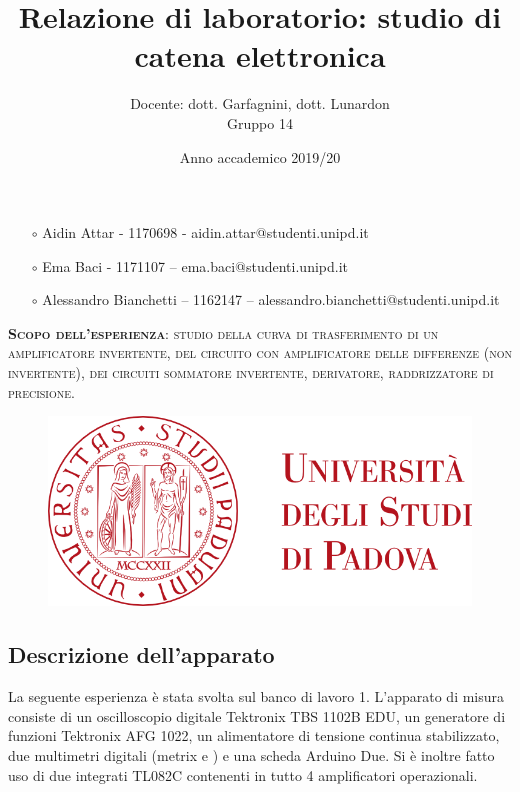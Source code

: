 \documentclass{article}
\title{Relazione di laboratorio: studio di catena elettronica}
\author{Docente: dott. Garfagnini, dott. Lunardon \\
Gruppo 14}
\date{Anno accademico 2019/20}
\begin{document}
\maketitle

\begin{itemize}
    \item[$\circ$] Aidin Attar - 1170698 - aidin.attar@studenti.unipd.it
    \item[$\circ$] Ema Baci - 1171107 – ema.baci@studenti.unipd.it
    \item[$\circ$] Alessandro Bianchetti – 1162147 – alessandro.bianchetti@studenti.unipd.it
\end{itemize}

\vspace{3 cm}
\begin{large}\textsc{\textbf{Scopo dell'esperienza}: studio della curva di trasferimento di un amplificatore invertente, del circuito con amplificatore delle differenze (non invertente), dei circuiti sommatore invertente, derivatore, raddrizzatore di precisione.} 
\end{large}
\vspace{8.5cm}

\begin{figure}[H]
\centering
\includegraphics[scale=0.5, angle=0]{unipd_logo.png}
\end{figure}


\twocolumn

\subsection*{Descrizione dell'apparato} La seguente esperienza è stata svolta sul banco di lavoro 1. L'apparato di misura consiste di 
un oscilloscopio digitale Tektronix TBS 1102B EDU, un generatore di funzioni Tektronix AFG 1022, un alimentatore di tensione continua stabilizzato,
due multimetri digitali (metrix e ) e una scheda Arduino Due. 
Si è inoltre fatto uso di due integrati TL082C contenenti in tutto 4 amplificatori operazionali.
\end{document}
